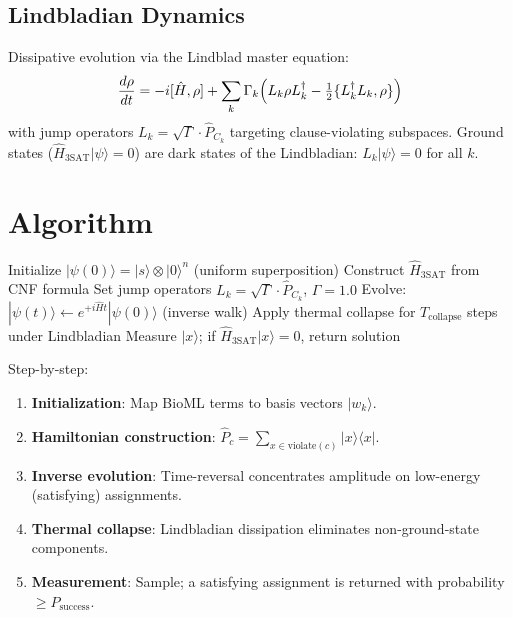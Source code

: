 \documentclass[12pt]{article}
\begin{document}
\subsection{Lindbladian Dynamics}

Dissipative evolution via the Lindblad master equation:
\begin{equation}
\frac{d\rho}{dt} = -i[\hat{H}, \rho]
+ \sum_k \Gamma_k\Bigl(L_k \rho L_k^\dagger - \tfrac{1}{2}\{L_k^\dagger L_k, \rho\}\Bigr)
\end{equation}
with jump operators $L_k = \sqrt{\Gamma}\cdot \hat{P}_{C_k}$ targeting clause-violating
subspaces. Ground states ($\hat{H}_{3\mathrm{SAT}}|\psi\rangle = 0$) are dark states of
the Lindbladian: $L_k|\psi\rangle = 0$ for all $k$.

\section{Algorithm}

\begin{algorithm}
\caption{I-CTQW for 3-SAT}
\begin{algorithmic}[1]
\State Initialize $|\psi(0)\rangle = |s\rangle \otimes |0\rangle^n$ (uniform superposition)
\State Construct $\hat{H}_{3\mathrm{SAT}}$ from CNF formula
\State Set jump operators $L_k = \sqrt{\Gamma}\cdot \hat{P}_{C_k}$, $\Gamma = 1.0$
\State Evolve: $|\psi(t)\rangle \leftarrow e^{+i\hat{H}t}|\psi(0)\rangle$ (inverse walk)
\State Apply thermal collapse for $T_{\mathrm{collapse}}$ steps under Lindbladian
\State Measure $|x\rangle$; if $\hat{H}_{3\mathrm{SAT}}|x\rangle = 0$, return solution
\end{algorithmic}
\end{algorithm}

Step-by-step:
\begin{enumerate}[label=(\arabic*)]
\item \textbf{Initialization}: Map BioML terms to basis vectors $|w_k\rangle$.
\item \textbf{Hamiltonian construction}: $\hat{P}_c = \sum_{x \in \mathrm{violate}(c)}|x\rangle\langle x|$.
\item \textbf{Inverse evolution}: Time-reversal concentrates amplitude on low-energy (satisfying)
assignments.
\item \textbf{Thermal collapse}: Lindbladian dissipation eliminates non-ground-state components.
\item \textbf{Measurement}: Sample; a satisfying assignment is returned with probability
$\geq P_{\mathrm{success}}$.
\end{enumerate}
\end{document}
